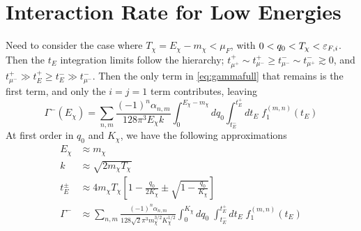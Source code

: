 \section{Interaction Rate for Low Energies}

Need to consider the case where $T_\chi = E_\chi - m_\chi <\mu_{F}$, with $0<q_0<T_\chi<\varepsilon_{F,i}$. Then the $t_E$ integration limits follow the hierarchy; $t_{\mu^{+}}^{+} \sim t_{\mu^{-}}^{+} \ge t_{\mu^{-}}^{-} \sim t_{\mu^{+}}^{-} \gtrsim 0$, and $t_{\mu^{-}}^{+} \gg t_E^+ \ge t_E^- \gg t_{\mu^{-}}^{-}$. Then the only term in \ref{eq:gammafull} that remains is the first term, and only the $i=j=1$ term contributes, leaving
\begin{equation}
    \Gamma^-(E_\chi) = \sum_{n,m}  \frac{(-1)^n \alpha_{n,m}}{128\pi^3 E_\chi k }\int_0^{E_\chi -m_\chi} dq_0\int_{t_E^-}^{t_E^+} d t_E\; f_1^{(m,n)}(t_E)
\end{equation}
At first order in $q_0$ and $K_\chi$, we have the following approximations
\begin{align}
    E_\chi &\approx m_\chi\\
    k &\approx \sqrt{2m_\chi T_\chi}\\
    t_E^\pm &\approx 4m_\chi T_\chi \left[ 1 - \frac{q_0}{2 K_\chi}\pm \sqrt{1 - \frac{q_0}{K_\chi}} \right]\\
    \Gamma^- & \approx \sum_{n,m}\frac{(-1)^n \alpha_{n,m}}{128\sqrt{2} \pi^3 m_\chi^{3/2}K_\chi^{1/2}}\int_0^{K_\chi} dq_0\;\int_{t_E^-}^{t_E^+} dt_E\;f_1^{(m,n)}(t_E)
\end{align}

